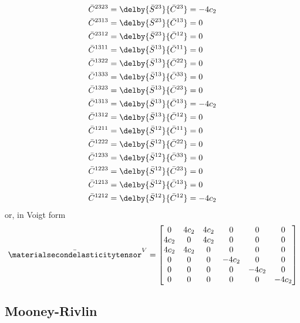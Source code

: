 \begin{equation}
\begin{split}
    \bar{C}^{2323}&=\delby{\bar{S}^{23}}{\bar{C}^{23}}=-4c_{2}\\
    \bar{C}^{2313}&=\delby{\bar{S}^{23}}{\bar{C}^{13}}=0\\
    \bar{C}^{2312}&=\delby{\bar{S}^{23}}{\bar{C}^{12}}=0\\
    \bar{C}^{1311}&=\delby{\bar{S}^{13}}{\bar{C}^{11}}=0\\
    \bar{C}^{1322}&=\delby{\bar{S}^{13}}{\bar{C}^{22}}=0\\
    \bar{C}^{1333}&=\delby{\bar{S}^{13}}{\bar{C}^{33}}=0\\
    \bar{C}^{1323}&=\delby{\bar{S}^{13}}{\bar{C}^{23}}=0\\
    \bar{C}^{1313}&=\delby{\bar{S}^{13}}{\bar{C}^{13}}=-4c_{2}\\
    \bar{C}^{1312}&=\delby{\bar{S}^{13}}{\bar{C}^{12}}=0\\
    \bar{C}^{1211}&=\delby{\bar{S}^{12}}{\bar{C}^{11}}=0\\
    \bar{C}^{1222}&=\delby{\bar{S}^{12}}{\bar{C}^{22}}=0\\
    \bar{C}^{1233}&=\delby{\bar{S}^{12}}{\bar{C}^{33}}=0\\
    \bar{C}^{1223}&=\delby{\bar{S}^{12}}{\bar{C}^{23}}=0\\
    \bar{C}^{1213}&=\delby{\bar{S}^{12}}{\bar{C}^{13}}=0\\
    \bar{C}^{1212}&=\delby{\bar{S}^{12}}{\bar{C}^{12}}=-4c_{2}\\
  \end{split}
\end{equation}
or, in Voigt form
\begin{equation}
  \bar{\materialsecondelasticitytensor}^{V}=\begin{bmatrix}
  0 & 4c_{2} & 4c_{2} & 0 & 0 & 0 \\
  4c_{2} & 0 & 4c_{2} & 0 & 0 & 0 \\
  4c_{2} & 4c_{2} & 0 & 0 & 0 & 0 \\
  0     & 0      & 0 & -4c_{2} & 0 & 0 \\
  0     & 0      & 0 & 0      & -4c_{2} & 0 \\
  0     & 0      & 0 & 0      & 0      & -4c_{2} 
  \end{bmatrix}
\end{equation}


  
\subsection{Mooney-Rivlin}

